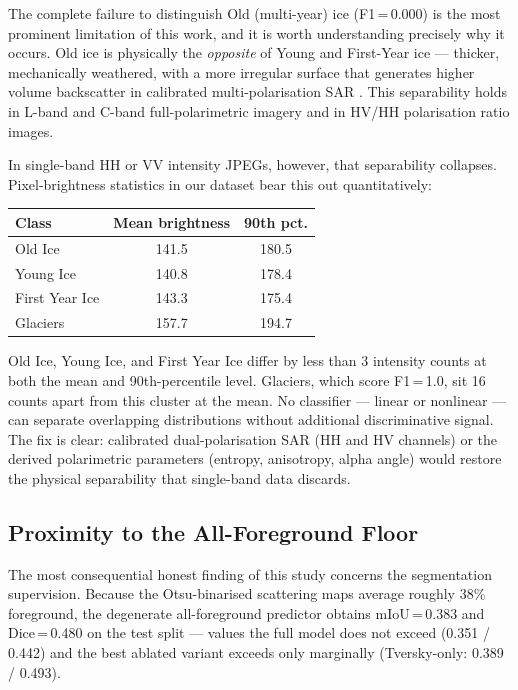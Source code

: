 \documentclass[remotesensing,article,accept,moreauthors,pdftex]{Definitions/mdpi}
\begin{document}
The complete failure to distinguish Old (multi-year) ice (F1\,=\,0.000) is the
most prominent limitation of this work, and it is worth understanding precisely
why it occurs. Old ice is physically the \emph{opposite} of Young and
First-Year ice — thicker, mechanically weathered, with a more irregular surface
that generates higher volume backscatter in calibrated multi-polarisation SAR
\cite{ulaby1990microwave}. This separability holds in L-band and C-band
full-polarimetric imagery and in HV/HH polarisation ratio images.

In single-band HH or VV intensity JPEGs, however, that separability collapses.
Pixel-brightness statistics in our dataset bear this out quantitatively:

\begin{center}
\begin{tabular}{lcc}
\toprule
\textbf{Class} & \textbf{Mean brightness} & \textbf{90th pct.} \\
\midrule
Old Ice       & 141.5 & 180.5 \\
Young Ice     & 140.8 & 178.4 \\
First Year Ice & 143.3 & 175.4 \\
\midrule
Glaciers      & 157.7 & 194.7 \\
\bottomrule
\end{tabular}
\end{center}

Old Ice, Young Ice, and First Year Ice differ by less than 3 intensity counts
at both the mean and 90th-percentile level. Glaciers, which score F1\,=\,1.0,
sit 16 counts apart from this cluster at the mean. No classifier — linear or
nonlinear — can separate overlapping distributions without additional
discriminative signal. The fix is clear: calibrated dual-polarisation SAR
(HH and HV channels) or the derived polarimetric parameters (entropy,
anisotropy, alpha angle) would restore the physical separability that
single-band data discards.

\subsection{Proximity to the All-Foreground Floor}
\label{sec:floor}

The most consequential honest finding of this study concerns the segmentation
supervision. Because the Otsu-binarised scattering maps average roughly 38\%
foreground, the degenerate all-foreground predictor obtains mIoU\,=\,0.383 and
Dice\,=\,0.480 on the test split — values the full model does not exceed
(0.351 / 0.442) and the best ablated variant exceeds only marginally
(Tversky-only: 0.389 / 0.493).
\end{document}

